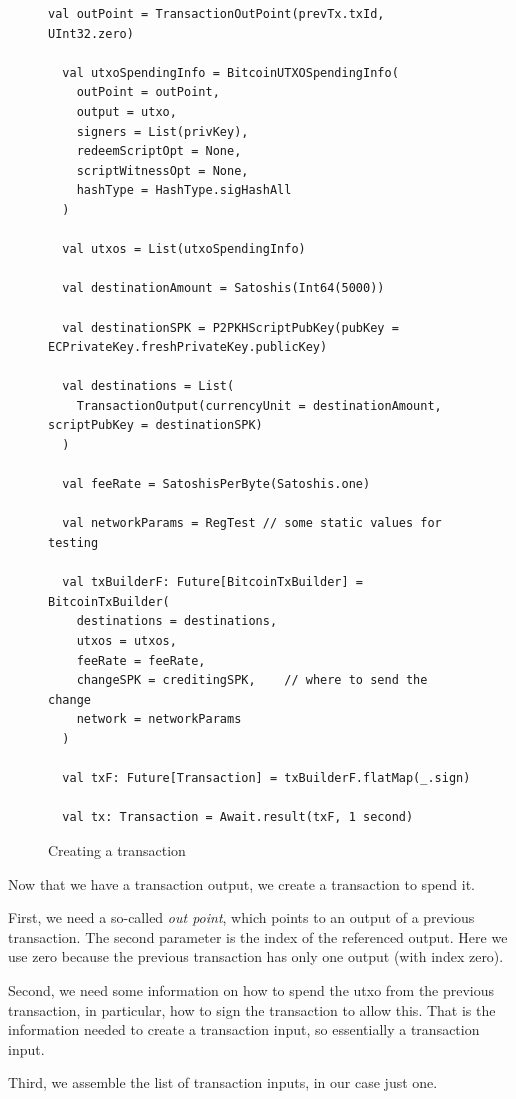 \documentclass[runningheads]{llncs}
\begin{document}
\begin{figure}
\begin{lstlisting}[style=scala]
  val outPoint = TransactionOutPoint(prevTx.txId, UInt32.zero)

  val utxoSpendingInfo = BitcoinUTXOSpendingInfo(
    outPoint = outPoint,
    output = utxo,
    signers = List(privKey),
    redeemScriptOpt = None,
    scriptWitnessOpt = None,
    hashType = HashType.sigHashAll
  )

  val utxos = List(utxoSpendingInfo)

  val destinationAmount = Satoshis(Int64(5000))

  val destinationSPK = P2PKHScriptPubKey(pubKey = ECPrivateKey.freshPrivateKey.publicKey)

  val destinations = List(
    TransactionOutput(currencyUnit = destinationAmount, scriptPubKey = destinationSPK)
  )

  val feeRate = SatoshisPerByte(Satoshis.one)

  val networkParams = RegTest // some static values for testing

  val txBuilderF: Future[BitcoinTxBuilder] = BitcoinTxBuilder(
    destinations = destinations, 
    utxos = utxos,               
    feeRate = feeRate,           
    changeSPK = creditingSPK,    // where to send the change
    network = networkParams      
  )

  val txF: Future[Transaction] = txBuilderF.flatMap(_.sign)

  val tx: Transaction = Await.result(txF, 1 second)
\end{lstlisting}
  \caption{Creating a transaction}
  \label{fig:tx}
\end{figure}

Now that we have a transaction output, we create a transaction to
spend it.

First, we need a so-called \emph{out point}, which points to an output
of a previous transaction. The second parameter is the index of the
referenced output. Here we use zero because the previous transaction
has only one output (with index zero).

Second, we need some information on how to spend the utxo from the
previous transaction, in particular, how to sign the transaction to
allow this. That is the information needed to create a transaction
input, so essentially a transaction input.

Third, we assemble the list of transaction inputs, in our case just one.
\end{document}
